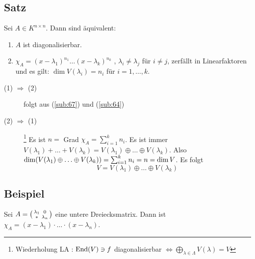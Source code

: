 \subsection[Satz über Diagonalisierbarkeit und Linearfaktoren des charakteristischen Polynoms]{Satz} %
\label{sub:68}
Sei $A \in K^{n \times n}$. Dann sind äquivalent:
\begin{enumerate}[(1)]
	\item $A$ ist diagonalisierbar.
	\item $\chi_A = (x- \lambda_1)^{n_1} \ldots (x-\lambda_k)^{n_k}$ , $\lambda_i \not= \lambda_j$ für $i \not=j$, zerfällt in Linearfaktoren und es gilt: 
	$\dim V(\lambda_i) = n_i$ für $i=1, \ldots , k$.
\end{enumerate}
\begin{description}
	\item[(1) $\Rightarrow$ (2)] folgt aus (\ref{sub:67}) und (\ref{sub:64})
	\item[(2) $\Rightarrow$ (1)] \footnote{Wiederholung LA : $ \End(V) \ni f$ diagonalisierbar $\Leftrightarrow \bigoplus_{\lambda  \in \Lambda} V(\lambda ) = V$}
	Es ist $n= $ Grad $\chi_A = \sum_{i=1}^{k} n_i$. Es ist immer $V(\lambda_1) + \ldots + V(\lambda_k) = V(\lambda_1) \oplus \ldots \oplus V(\lambda_k)$. Also 
	$\dim \enbrace*{V(\lambda_1) \oplus \ldots \oplus V(\lambda_k)} = \sum_{i=1}^{k} n_i = n = \dim V $. Es folgt 
	\[
		V=V(\lambda_1) \oplus \ldots \oplus V(\lambda_k) \tag*{$\square$}
	\]
\end{description}

\subsection[Beispiel: Zerfallen einer unteren Dreiecksmatrix in Linearfaktoren]{Beispiel} %
\label{sub:69}
Sei $A= \enbrace*{\begin{smallmatrix}\lambda_1 & 0 \\ * & \lambda_n \end{smallmatrix}} $ eine untere Dreiecksmatrix. Dann ist 
$\chi_A= (x-\lambda_1) \cdot \ldots \cdot (x-\lambda_n)$.


